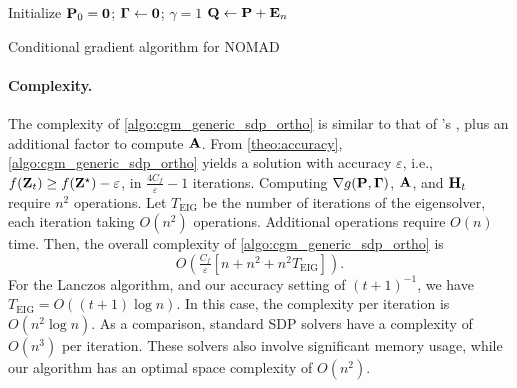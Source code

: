 \documentclass[twoside,11pt]{article}
\begin{document}
\begin{algorithm2e}[t]
	\SetNoFillComment

	\begin{small}
    
	Initialize ${\mathbf{P}}_0 = {\mathbf{0}}$;\quad
    ${\mathbf{\Gamma}} \gets {\mathbf{0}}$;\quad
    $\gamma = 1$\;
	${\mathbf{Q}} \gets {\mathbf{P}} + {\mathbf{E}}_n$
    \end{small}
	
	\caption{Conditional gradient algorithm for NOMAD}
	\label{algo:cgm_sdp-km}
\end{algorithm2e}

\paragraph{Complexity.}
The complexity of \cref{algo:cgm_generic_sdp_ortho} is similar to that of \citeauthor{Hazan2008sdp}'s \citeyearpar{Hazan2008sdp}, plus an additional factor to compute ${\mathbf{A}}$.
From \cref{theo:accuracy}, \cref{algo:cgm_generic_sdp_ortho} yields a solution with accuracy $\varepsilon$, i.e., $f({\mathbf{Z}}_t) \geq f({\mathbf{Z}}^{\star}) - \varepsilon$, in $\tfrac{4 C_f}{\varepsilon} - 1$ iterations. Computing $\nabla g({\mathbf{P}}, {\mathbf{\Gamma}})$, ${\mathbf{A}}$, and ${\mathbf{H}}_t$ require $n^2$ operations.
Let $T_{\text{EIG}}$ be the number of iterations of the eigensolver, each iteration taking $O(n^2)$ operations. Additional operations require $O(n)$ time. Then, the overall complexity of \cref{algo:cgm_generic_sdp_ortho} is
\begin{equation}
	O \left( \tfrac{C_f}{\varepsilon} \left[ n + n^2 + n^2 T_{\text{EIG}} \right] \right) .
\end{equation}
For the Lanczos algorithm, and our accuracy setting of $(t + 1)^{-1}$, we have $T_{\text{EIG}} = O((t + 1) \log n)$.
In this case, the complexity per iteration is $O(n^2 \log n)$. As a comparison, standard SDP solvers have a complexity of $O(n^3)$ per iteration. These solvers also involve significant memory usage, while our algorithm has an optimal space complexity of $O(n^2)$.
\end{document}
